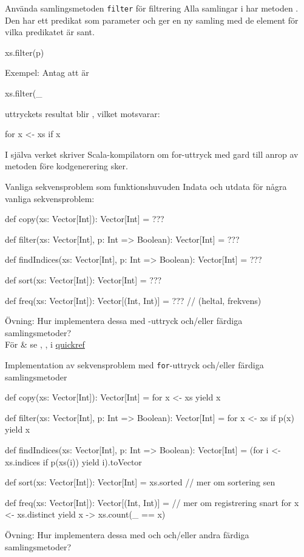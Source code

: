 \begin{Slide}{Använda samlingsmetoden \texttt{filter} för filtrering}
Alla samlingar i  har metoden . Den har ett predikat som parameter  och ger en ny samling med de element för vilka predikatet är sant.
\begin{Code}[basicstyle=\ttfamily\SlideFontSize{12}{14}]
xs.filter(p)
\end{Code}
\pause
Exempel: Antag att  är 
\begin{REPLnonum}
xs.filter(_ %
\end{REPLnonum}
\pause
uttryckets resultat blir , vilket motsvarar:
\begin{Code}[basicstyle=\ttfamily\SlideFontSize{10}{13}]
for x <- xs if x %
\end{Code}
\pause
I själva verket skriver Scala-kompilatorn om for-uttryck med gard till anrop av metoden  före kodgenerering sker.
\end{Slide}


\begin{Slide}{Vanliga sekvensproblem som funktionshuvuden}
Indata och utdata för några vanliga sekvensproblem:
\begin{Code}
def copy(xs: Vector[Int]): Vector[Int] = ???

def filter(xs: Vector[Int], p: Int => Boolean): Vector[Int] = ???

def findIndices(xs: Vector[Int], p: Int => Boolean): Vector[Int] = ???

def sort(xs: Vector[Int]): Vector[Int] = ???

def freq(xs: Vector[Int]): Vector[(Int, Int)] = ???  // (heltal, frekvens)
\end{Code}
Övning: Hur implementera dessa med -uttryck och/eller färdiga samlingsmetoder?\\
 För \& se , ,  i \href{http://cs.lth.se/pgk/quickref/}{quickref}
\end{Slide}


\begin{Slide}{Implementation av sekvensproblem med \texttt{for}-uttryck och/eller färdiga samlingsmetoder}
\begin{Code}
def copy(xs: Vector[Int]): Vector[Int] = for x <- xs yield x

def filter(xs: Vector[Int], p: Int => Boolean): Vector[Int] =
  for x <- xs if p(x) yield x

def findIndices(xs: Vector[Int], p: Int => Boolean): Vector[Int] =
  (for i <- xs.indices if p(xs(i)) yield i).toVector

def sort(xs: Vector[Int]): Vector[Int] = xs.sorted // mer om sortering sen

def freq(xs: Vector[Int]): Vector[(Int, Int)] = // mer om registrering snart
  for x <- xs.distinct yield x -> xs.count(_ == x)
\end{Code}
Övning: Hur implementera dessa med  och  och/eller andra färdiga samlingsmetoder?
\end{Slide}


